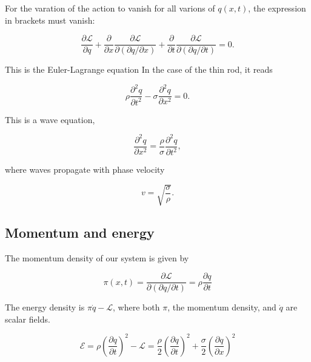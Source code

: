 For the varation of the action to vanish for all varions of $q(x,t)$, the expression in brackets must vanish:

\begin{equation}
\frac{\partial \mathcal{L}}{\partial q}
+ \frac{\partial }{\partial x}\frac{\partial \mathcal{L}}{\partial (\partial q/\partial x) } 
+  \frac{\partial}{\partial t}\frac{\partial \mathcal{L}}{\partial (\partial q/\partial t) } = 0 .
\end{equation}

This is the Euler-Lagrange equation
In the case of the thin rod, it reads

\begin{equation}
\rho\frac{\partial^2 q}{\partial t^2} 
-  \sigma\frac{\partial^2 q}{\partial x^2}= 0 .
\end{equation}

This is a wave equation,

\begin{equation}
\frac{\partial^2 q}{\partial x^2}
= \frac{\rho}{\sigma}\frac{\partial^2 q}{\partial t^2} ,
\end{equation}

where waves propagate with phase velocity

\begin{equation}
v = \sqrt{\frac{\sigma}{\rho}} .
\end{equation}





\subsection{Momentum and energy}

The momentum density of our system is given by 

\begin{equation}
\pi(x,t) 
= \frac{\partial \mathcal{L}}{\partial (\partial q/\partial t)} 
= \rho \frac{\partial q}{\partial t}
\end{equation}

The energy density is $\pi\dot q - \mathcal{L}$, where both $\pi$, the momentum density, and $\dot q$ are scalar fields.

\begin{equation}
\mathcal{E} 
= \rho \left(\frac{\partial q}{\partial t} \right)^2 - \mathcal{L}
= \frac{\rho}{2}\left(\frac{\partial q}{\partial t} \right)^2 
+
\frac{\sigma}{2} \left(\frac{\partial q}{\partial x} \right)^2
\end{equation}

